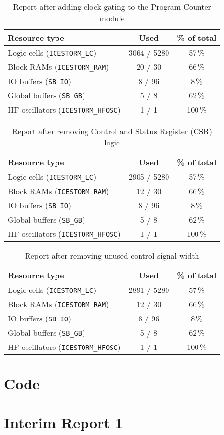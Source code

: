 \documentclass[a4paper,10pt]{article}
\begin{document}
\begin{table}[H] 
    \centering
    \begin{tabularx}{0.6\textwidth}{X c c}
        \toprule
        Resource type & Used & \% of total \\ \midrule
        Logic cells (\texttt{ICESTORM\_LC}) & 3064 / 5280 & 57\,\% \\
        Block RAMs (\texttt{ICESTORM\_RAM}) & 20 / 30 & 66\,\% \\
        IO buffers (\texttt{SB\_IO}) & 8 / 96 & 8\,\% \\
        Global buffers (\texttt{SB\_GB}) & 5 / 8 & 62\,\% \\
        HF oscillators (\texttt{ICESTORM\_HFOSC}) & 1 / 1 & 100\,\% \\
        \bottomrule
    \end{tabularx}
    \caption{Report after adding clock gating to the Program Counter module}
    \label{tab:Program_Counter}
\end{table}

\begin{table}[H] 
    \centering
    \begin{tabularx}{0.6\textwidth}{X c c}
        \toprule
        Resource type & Used & \% of total \\ \midrule
        Logic cells (\texttt{ICESTORM\_LC}) & 2905 / 5280 & 57\,\% \\
        Block RAMs (\texttt{ICESTORM\_RAM}) & 12 / 30 & 66\,\% \\
        IO buffers (\texttt{SB\_IO}) & 8 / 96 & 8\,\% \\
        Global buffers (\texttt{SB\_GB}) & 5 / 8 & 62\,\% \\
        HF oscillators (\texttt{ICESTORM\_HFOSC}) & 1 / 1 & 100\,\% \\
        \bottomrule
    \end{tabularx}
    \caption{Report after removing Control and Status Register (CSR) logic}
    \label{tab:CSR}
\end{table}

\begin{table}[H] 
    \centering
    \begin{tabularx}{0.6\textwidth}{X c c}
        \toprule
        Resource type & Used & \% of total \\ \midrule
        Logic cells (\texttt{ICESTORM\_LC}) & 2891 / 5280 & 57\,\% \\
        Block RAMs (\texttt{ICESTORM\_RAM}) & 12 / 30 & 66\,\% \\
        IO buffers (\texttt{SB\_IO}) & 8 / 96 & 8\,\% \\
        Global buffers (\texttt{SB\_GB}) & 5 / 8 & 62\,\% \\
        HF oscillators (\texttt{ICESTORM\_HFOSC}) & 1 / 1 & 100\,\% \\
        \bottomrule
    \end{tabularx}
    \caption{Report after removing unused control signal width}
    \label{tab:Signal_Width}
\end{table}

\section{Code}

\section{Interim Report 1}
\label{sec:{Interim_Report_1}}

\end{document}
